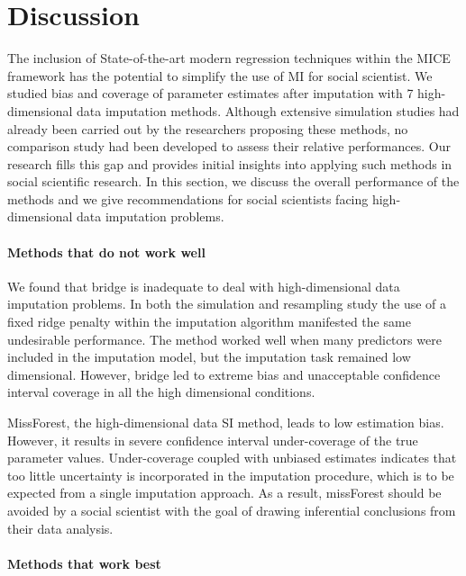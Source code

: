 \section{Discussion}

	The inclusion of State-of-the-art modern regression techniques within the MICE framework has the potential
	to simplify the use of MI for social scientist.
	We studied bias and coverage of parameter estimates after imputation with 7 high-dimensional data 
	imputation methods.
	Although extensive simulation studies had already been carried out by the researchers proposing these methods, 
	no comparison study had been developed to assess their relative performances.
	Our research fills this gap and provides initial insights into applying such methods in social scientific research.
	In this section, we discuss the overall performance of the methods and we give recommendations for social scientists 
	facing high-dimensional data imputation problems.

\paragraph{Methods that do not work well}

	We found that bridge is inadequate to deal with  high-dimensional data imputation problems.
	In both the simulation and resampling study the use of a fixed ridge penalty within the imputation
	algorithm manifested the same undesirable performance.
	The method worked well when many predictors were included in the imputation model, but the imputation
	task remained low dimensional.
	However, bridge led to extreme bias and unacceptable confidence interval coverage in all the high 
	dimensional conditions.

	MissForest, the high-dimensional data SI method, leads to low estimation bias.
	However, it results in severe confidence interval under-coverage of the true parameter 
	values.
	Under-coverage coupled with unbiased estimates indicates that too little uncertainty is incorporated in 
	the imputation procedure, which is to be expected from a single imputation approach.
	As a result, missForest should be avoided by a social scientist with the goal of drawing inferential 
	conclusions from their data analysis.

\paragraph{Methods that work best}

